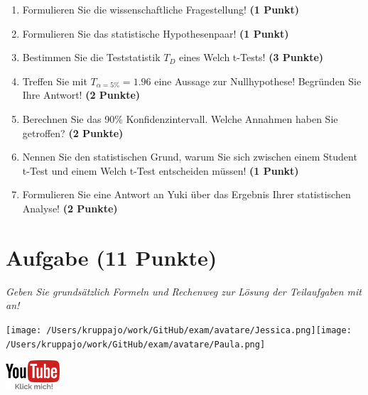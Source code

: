 \documentclass[a4paper, 9pt]{scrartcl}\usepackage[]{graphicx}\usepackage[]{xcolor}
\begin{document}
\begin{enumerate}
  \item Formulieren Sie die wissenschaftliche Fragestellung! \textbf{(1 Punkt)}
  \item Formulieren Sie das statistische Hypothesenpaar! \textbf{(1 Punkt)}
  \item Bestimmen Sie die Teststatistik $T_{D}$ eines  Welch t-Tests! \textbf{(3 Punkte)}
  \item Treffen Sie mit $T_{\alpha = 5\%} = 1.96$ eine Aussage zur Nullhypothese! Begründen Sie Ihre Antwort! \textbf{(2 Punkte)}
\item Berechnen Sie das 90\% Konfidenzintervall. Welche Annahmen haben Sie getroffen? \textbf{(2 Punkte)}
\item Nennen Sie den statistischen Grund, warum Sie sich zwischen einem Student t-Test und einem Welch t-Test entscheiden müssen! \textbf{(1 Punkt)}
\item Formulieren Sie eine Antwort an Yuki über das Ergebnis Ihrer statistischen Analyse! \textbf{(2 Punkte)}
\end{enumerate} 
\clearpage

\section{Aufgabe \hfill (11 Punkte)}

\textit{Geben Sie grundsätzlich Formeln und Rechenweg zur Lösung der Teilaufgaben mit an!} \\[1Ex]
 

 
\begin{minipage}[t]{0.5\textwidth}
\texttt{[image: /Users/kruppajo/work/GitHub/exam/avatare/Jessica.png]}\hspace{-4mm}\texttt{[image: /Users/kruppajo/work/GitHub/exam/avatare/Paula.png]}
\end{minipage}
\begin{minipage}[t]{0.5\textwidth}
\hfill
\href{https://youtu.be/QR90zyn0Iz8}{\includegraphics[width = 2cm]{img/youtube}}
\end{minipage}
\end{document}
